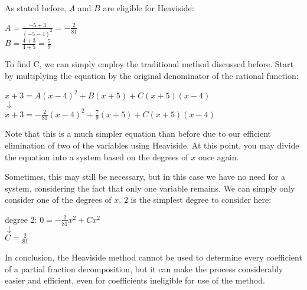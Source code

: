 \documentclass[11pt]{article}
\begin{document}
As stated before, $A$ and $B$ are eligible for Heaviside: 

\begin{center}
$A = \frac{-5+3}{(-5-4)^2} = -\frac{2}{81}$\\
$B = \frac{4+3}{4+5} = \frac{7}{9}$\\
\end{center}

To find C, we can simply employ the traditional method discussed before. Start by multiplying the equation by the original denominator of the rational function:

\begin{center}
$x+3 = A(x-4)^2 + B(x+5) + C(x+5)(x-4)$\\
$\downarrow$ \\
$x+3 = -\frac{2}{81}(x-4)^2 + \frac{7}{9}(x+5) + C(x+5)(x-4) $
\end{center}

Note that this is a much simpler equation than before due to our efficient elimination of two of the variables using Heaviside. At this point, you may divide the equation into a system based on the degrees of $x$ once again. 

Sometimes, this may still be necessary, but in this case we have no need for a system, considering the fact that only one variable remains. We can simply only consider one of the degrees of $x$. $2$ is the simplest degree to consider here:

\begin{center}
degree 2: $0 = -\frac{2}{81}x^2 + Cx^2$\\
$\downarrow$ \\
$C = \frac{2}{81}$
\end{center}

In conclusion, the Heaviside method cannot be used to determine every coefficient of a partial fraction decomposition, but it can make the process considerably easier and efficient, even for coefficients ineligible for use of the method. 
\end{document}
